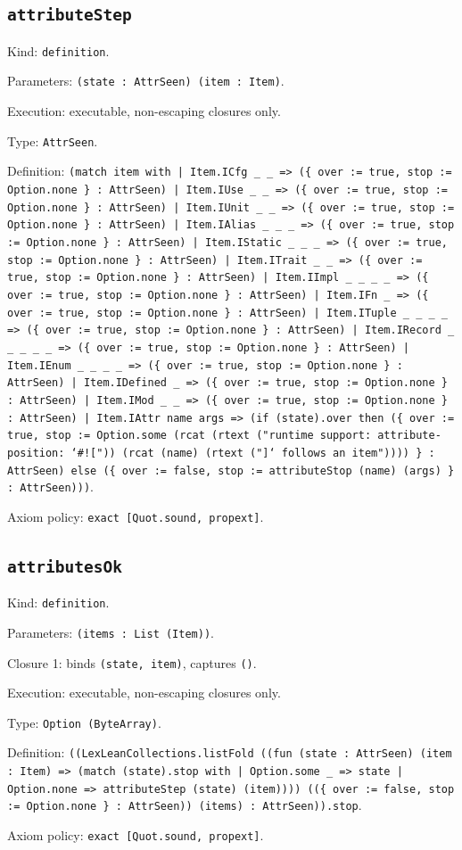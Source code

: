 \documentclass[11pt]{article}
\begin{document}
\subsection*{\texttt{attributeStep}}
\noindent Kind: \texttt{definition}.\par
\noindent Parameters: \texttt{(state : AttrSeen) (item : Item)}.\par
\noindent Execution: executable, non-escaping closures only.\par
\noindent Type: \texttt{AttrSeen}.\par
\noindent Definition: \texttt{(match item with | Item.ICfg \_ \_ => (\{ over := true, stop := Option.none \} : AttrSeen) | Item.IUse \_ \_ => (\{ over := true, stop := Option.none \} : AttrSeen) | Item.IUnit \_ \_ => (\{ over := true, stop := Option.none \} : AttrSeen) | Item.IAlias \_ \_ \_ => (\{ over := true, stop := Option.none \} : AttrSeen) | Item.IStatic \_ \_ \_ => (\{ over := true, stop := Option.none \} : AttrSeen) | Item.ITrait \_ \_ => (\{ over := true, stop := Option.none \} : AttrSeen) | Item.IImpl \_ \_ \_ \_ => (\{ over := true, stop := Option.none \} : AttrSeen) | Item.IFn \_ => (\{ over := true, stop := Option.none \} : AttrSeen) | Item.ITuple \_ \_ \_ \_ => (\{ over := true, stop := Option.none \} : AttrSeen) | Item.IRecord \_ \_ \_ \_ \_ => (\{ over := true, stop := Option.none \} : AttrSeen) | Item.IEnum \_ \_ \_ \_ => (\{ over := true, stop := Option.none \} : AttrSeen) | Item.IDefined \_ => (\{ over := true, stop := Option.none \} : AttrSeen) | Item.IMod \_ \_ => (\{ over := true, stop := Option.none \} : AttrSeen) | Item.IAttr name args => (if (state).over then (\{ over := true, stop := Option.some (rcat (rtext ("runtime support: attribute-position: `\#![")) (rcat (name) (rtext ("]` follows an item")))) \} : AttrSeen) else (\{ over := false, stop := attributeStop (name) (args) \} : AttrSeen)))}.\par
\noindent Axiom policy: \texttt{exact [Quot.sound, propext]}.\par
\subsection*{\texttt{attributesOk}}
\noindent Kind: \texttt{definition}.\par
\noindent Parameters: \texttt{(items : List (Item))}.\par
\noindent Closure 1: binds \texttt{(state, item)}, captures \texttt{()}.\par
\noindent Execution: executable, non-escaping closures only.\par
\noindent Type: \texttt{Option (ByteArray)}.\par
\noindent Definition: \texttt{((LexLeanCollections.listFold ((fun (state : AttrSeen) (item : Item) => (match (state).stop with | Option.some \_ => state | Option.none => attributeStep (state) (item)))) ((\{ over := false, stop := Option.none \} : AttrSeen)) (items) : AttrSeen)).stop}.\par
\noindent Axiom policy: \texttt{exact [Quot.sound, propext]}.\par
\end{document}
